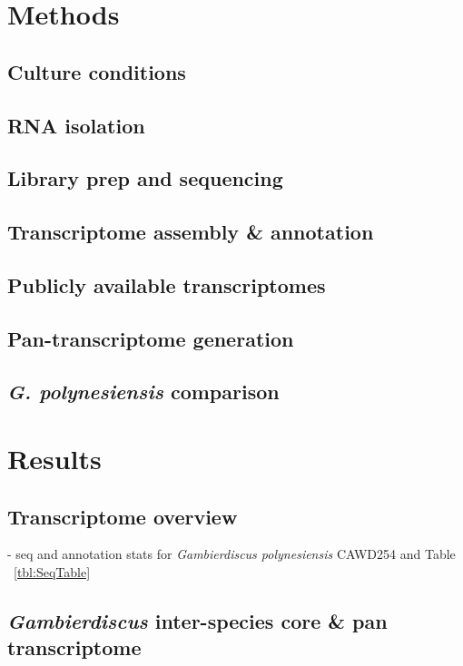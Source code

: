 \documentclass[12pt]{article}
\begin{document}
\section*{Methods}

\subsection*{Culture conditions}
\subsection*{RNA isolation}
\subsection*{Library prep and sequencing}
\subsection*{Transcriptome assembly \& annotation}

\subsection*{Publicly available transcriptomes}

\subsection*{Pan-transcriptome generation}

\subsection*{\textit{G. polynesiensis} comparison}
\newpage
\section*{Results}
\FloatBarrier
\subsection*{Transcriptome overview}
- seq and annotation stats for \textit{Gambierdiscus polynesiensis} CAWD254 and Table ~\ref{tbl:SeqTable}
\subsection*{\emph{Gambierdiscus} inter-species core \& pan transcriptome}
\end{document}
